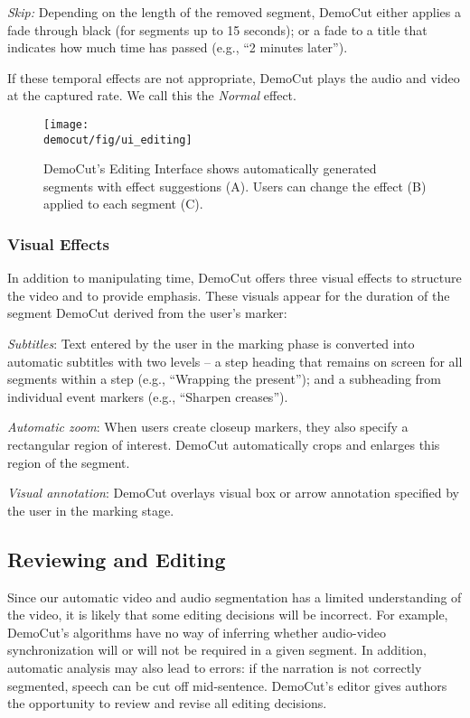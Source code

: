 {\em Skip:} Depending on the length of the removed segment, DemoCut either applies a fade through black (for segments up to 15 seconds); or a fade to a title that indicates how much time has passed (e.g., ``2 minutes later'').

If these temporal effects are not appropriate, DemoCut plays the audio and video at the captured rate. We call this the {\em Normal} effect.

\begin{figure*}[t!]
  \centering
  \texttt{[image: \\democut/fig/ui\_editing]}
  \caption{DemoCut's Editing Interface shows automatically generated segments with effect suggestions (A). Users can change the effect (B) applied to each segment (C).}
  \label{fig:ui_editing}
\end{figure*}

\subsubsection{Visual Effects}
In addition to manipulating time, DemoCut offers three visual effects to structure the video and to provide emphasis. These visuals appear for the duration of the segment DemoCut derived from the user's marker:

{\em Subtitles}: Text entered by the user in the marking phase is converted into automatic subtitles with two levels -- a step heading that remains on screen for all segments within a step (e.g., ``Wrapping the present''); and a subheading from individual event markers (e.g., ``Sharpen creases'').

{\em Automatic zoom}: When users create closeup markers, they also specify a rectangular region of interest. DemoCut automatically crops and enlarges this region of the segment.

{\em Visual annotation}: DemoCut overlays visual box or arrow annotation specified by the user in the marking stage.

\subsection{Reviewing and Editing}
Since our automatic video and audio segmentation has a limited understanding of the video, it is likely that some editing decisions will be incorrect. For example, DemoCut's algorithms have no way of inferring whether audio-video synchronization will or will not be required in a given segment. In addition, automatic analysis may also lead to errors: if the narration is not correctly segmented, speech can be cut off mid-sentence. DemoCut's editor gives authors the opportunity to review and revise all editing decisions.

